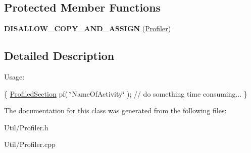 \subsection*{\-Protected \-Member \-Functions}
\begin{DoxyCompactItemize}
\item 
\hypertarget{class_profiler_aea7082b3ac45f3e77f163e7647c03b67}{{\bfseries \-D\-I\-S\-A\-L\-L\-O\-W\-\_\-\-C\-O\-P\-Y\-\_\-\-A\-N\-D\-\_\-\-A\-S\-S\-I\-G\-N} (\hyperlink{class_profiler}{\-Profiler})}\label{class_profiler_aea7082b3ac45f3e77f163e7647c03b67}

\end{DoxyCompactItemize}


\subsection{\-Detailed \-Description}
\-Usage\-:

\{ \hyperlink{class_profiled_section}{\-Profiled\-Section} pf( \char`\"{}\-Name\-Of\-Activity\char`\"{} ); // do something time consuming... \} 

\-The documentation for this class was generated from the following files\-:\begin{DoxyCompactItemize}
\item 
\-Util/\-Profiler.\-h\item 
\-Util/\-Profiler.\-cpp\end{DoxyCompactItemize}

